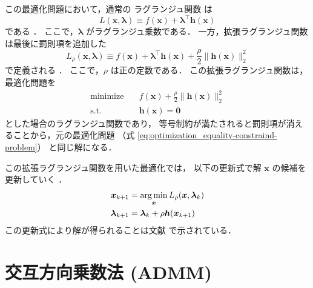 この最適化問題において，通常の
ラグランジュ関数
は
\begin{equation}
    L(\bm{x}, \bm{\lambda}) \equiv f(\bm{x}) + \bm{\lambda}^\top \bm{h}(\bm{x})
\end{equation}
である \cite{Boyd2010, Hisano2012}．
ここで，$\bm{\lambda}$ がラグランジュ乗数である．
一方，拡張ラグランジュ関数は最後に罰則項を追加した
\begin{equation}
    L_{\rho}(\bm{x}, \bm{\lambda}) \equiv f(\bm{x}) + \bm{\lambda}^\top \bm{h}(\bm{x})
    + \frac{\rho}{2}\|\bm{h}(\bm{x})\|_2^2
\end{equation}
で定義される \cite{Boyd2010, Hisano2012}．
ここで，$\rho$ は正の定数である．
この拡張ラグランジュ関数は，最適化問題を
\begin{equation}
    \begin{aligned}
        \text{minimize} \hspace{1em} & f(\bm{x})  + \frac{\rho}{2}\|\bm{h}(\bm{x})\|_2^2 \\
        \text{s.t.} \hspace{1em}     & \bm{h}(\bm{x}) = \bm{0}
    \end{aligned}
\end{equation}
とした場合のラグランジュ関数であり，
等号制約が満たされると罰則項が消えることから，元の最適化問題
（式 \eqref{eq:optimization_equality-constraind-problem}）
と同じ解になる．

この拡張ラグランジュ関数を用いた最適化では，
以下の更新式で解 $\bm{x}$ の候補を更新していく \cite{Boyd2010, Hisano2012}．
\begin{align}
    \bm{x}_{k+1}       & = \operatorname*{arg \thinspace min}_{\bm{x}} L_{\rho}(\bm{x}, \bm{\lambda}_{k}) \\
    \bm{\lambda}_{k+1} & = \bm{\lambda}_k + \rho \bm{h}(\bm{x}_{k+1})
\end{align}
この更新式により解が得られることは文献 \cite{Ito2008} で示されている．

\section{交互方向乗数法 (ADMM)}\label{sec:optimization_admm}

